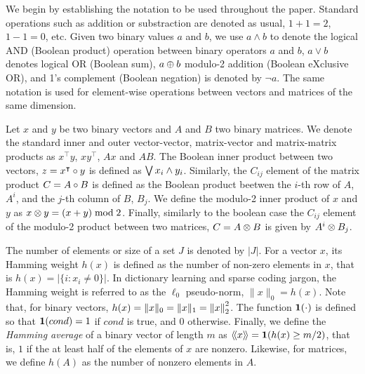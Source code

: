 \documentclass[twocolumn]{IEEEtran}
\theoremstyle{definition}
\def\transp{^\intercal}
\begin{document}
We begin by establishing the notation to be used throughout the paper.
Standard operations such as addition or substraction are denoted as usual, $1+1=2$, $1-1=0$, etc. Given two binary values $a$ and $b$, we use $a \land b$ to denote the logical AND (Boolean product) operation between binary operators $a$ and $b$, $a \lor b$ denotes logical OR (Boolean sum),  $a \oplus b$ modulo-2 addition (Boolean eXclusive OR), and 1's complement  (Boolean negation) is denoted by $\neg a$. The same notation is used for element-wise operations between vectors and matrices of the same dimension.

Let $x$ and $y$ be two binary vectors and $A$ and $B$ two binary matrices.
We denote the standard  inner and outer vector-vector, matrix-vector and matrix-matrix products as $x{\transp}y$, $xy\transp$, $Ax$ and $AB$.
The Boolean inner product between two vectors, $z = x\transp \bprod y$ is defined as $\bigvee x_i \land y_i$. Similarly, the $C_{ij}$ element of the matrix product $C=A \circ B$ is defined as the Boolean product beetwen the $i$-th row of $A$, $A^i$,  and the $j$-th column of $B$, $B_j$. We define the modulo-2 inner product of $x$ and $y$ as $x \otimes y = (x+y)\;\mathrm{mod} \;2$. Finally, similarly to the boolean case the $C_{ij}$ element of the modulo-2 product between two matrices, $C=A \otimes B$ is given by $A^i \otimes B_j$. 

The number of elements or size of a set $J$ is denoted by $|J|$. 
For a vector $x$, its Hamming weight $h(x)$ is defined as the number of non-zero elements in $x$, that is $h(x)=|\{i: x_i \neq 0\}|$. In dictionary learning and sparse coding jargon, the Hamming weight is referred to as the $\ell_0$ pseudo-norm, $\|x\|_0=h(x)$. Note that, for binary vectors, $h(x)=\|x\|_0=\|x\|_1=\left\|x\right\|_2^2$. The function $\mathbf{1}(\cdot)$ is defined so that $\mathbf{1}(cond)=1$ if $cond$ is true, and $0$ otherwise. 
Finally, we define the \emph{Hamming average} of a binary vector of length $m$  as $\langle\!\langle{x}\rangle\!\rangle = \mathbf{1}(h(x) \geq m/2)$, that is, $1$ if the at least half of the elements of $x$ are nonzero. Likewise, for matrices, we define $h(A)$ as the number of nonzero elements in $A$.
\end{document}

